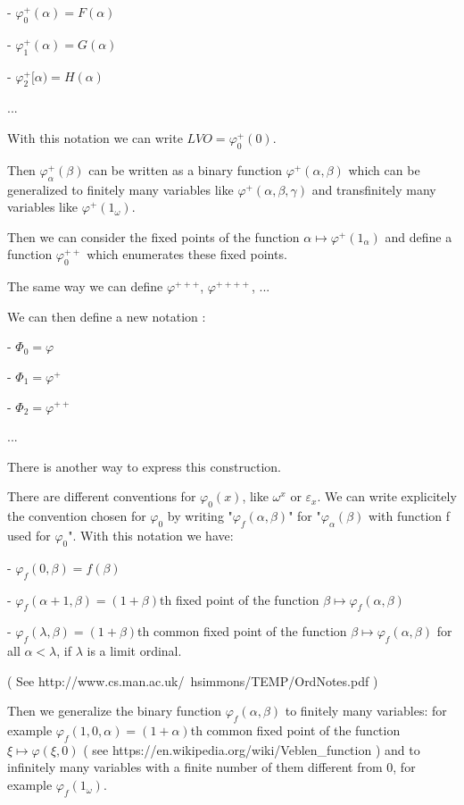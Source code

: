 \documentclass[10pt]{article}
\begin{document}
 - \( \varphi^+_0(\alpha) = F(\alpha) \)

 - \( \varphi^+_1(\alpha) = G(\alpha) \)

 - \( \varphi^+_2[\alpha) = H(\alpha) \)

 ...

With this notation we can write \( LVO = \varphi^+_0(0) \).

Then \( \varphi^+_\alpha(\beta) \) can be written as a binary function \( \varphi^+(\alpha,\beta) \) which can be generalized to finitely many variables like \( \varphi^+(\alpha,\beta,\gamma) \) and transfinitely many variables like \( \varphi^+(1_\omega) \).

Then we can consider the fixed points of the function \( \alpha \mapsto \varphi^+(1_\alpha) \) and define a function \( \varphi^{++}_0 \) which enumerates these fixed points.

The same way we can define \( \varphi^{+++} \), \( \varphi^{++++} \), ...

We can then define a new notation : 

 - \( \Phi_0 = \varphi \)
 
 - \( \Phi_1 = \varphi^+ \)

 - \( \Phi_2 = \varphi^{++} \)

 ...

\bigskip

There is another way to express this construction.

There are different conventions for \( \varphi_0(x) \), like \( \omega^x \) or \( \varepsilon_x \). We can write explicitely the convention chosen for \( \varphi_0 \) by writing "\( \varphi_f(\alpha,\beta) \)" for "\( \varphi_\alpha(\beta) \) with function f used for \( \varphi_0 \)".  With this notation we have:

 - \( \varphi_f(0,\beta) = f(\beta) \)
 
 - \( \varphi_f(\alpha+1,\beta) = (1+\beta) \)th fixed point of the function \( \beta \mapsto \varphi_f(\alpha,\beta) \)
 
 - \( \varphi_f(\lambda,\beta) = (1+\beta) \)th common fixed point of the function \( \beta \mapsto \varphi_f(\alpha,\beta) \) for all \( \alpha < \lambda \), if \( \lambda \) is a limit ordinal.

( See http://www.cs.man.ac.uk/~hsimmons/TEMP/OrdNotes.pdf )

Then we generalize the binary function \( \varphi_f(\alpha,\beta) \) to finitely many variables: for example \( \varphi_f(1,0,\alpha) = (1+\alpha) \)th common fixed point of the function \( \xi \mapsto \varphi(\xi,0) \) ( see https://en.wikipedia.org/wiki/Veblen\_function ) and to infinitely many variables with a finite number of them different from 0, for example \( \varphi_f(1_\omega) \).
\end{document}
